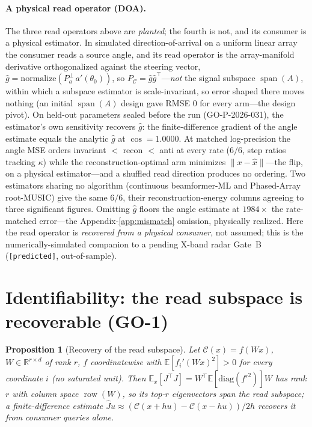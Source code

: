 \documentclass[11pt]{article}
\newtheorem{proposition}{Proposition}
\theoremstyle{definition}
\theoremstyle{remark}
\newcommand{\PC}{P_{\mathcal{C}}}
\newcommand{\E}{\mathbb{E}}
\newcommand{\R}{\mathbb{R}}
\begin{document}
\paragraph{A physical read operator (DOA).} The three read operators above are
\emph{planted}; the fourth is not, and its consumer is a physical estimator. In simulated
direction-of-arrival on a uniform linear array the consumer reads a source angle, and its
read operator is the array-manifold derivative orthogonalized against the steering vector,
$\hat g=\mathrm{normalize}(P_a^\perp\,a'(\theta_0))$, so $\PC=\hat g\hat g^\top$---\emph{not}
the signal subspace $\operatorname{span}(A)$, within which a subspace estimator is
scale-invariant, so error shaped there moves nothing (an initial $\operatorname{span}(A)$
design gave RMSE $0$ for every arm---the design pivot). On held-out parameters sealed before
the run (GO-P-2026-031), the estimator's own sensitivity recovers $\hat g$: the
finite-difference gradient of the angle estimate equals the analytic $\hat g$ at
$\cos=1.0000$. At matched log-precision the angle MSE orders invariant $<$ recon $<$ anti at
every rate ($6/6$, step ratios tracking $\kappa$) while the reconstruction-optimal arm
minimizes $\|x-\hat x\|$---the flip, on a physical estimator---and a shuffled read direction
produces no ordering. Two estimators sharing no algorithm (continuous beamformer-ML and
Phased-Array root-MUSIC) give the same $6/6$, their reconstruction-energy columns agreeing to
three significant figures. Omitting $\hat g$ floors the angle estimate at $1984\times$ the
rate-matched error---the Appendix-\ref{app:mismatch} omission, physically realized. Here the
read operator is \emph{recovered from a physical consumer}, not assumed; this is the
numerically-simulated companion to a pending X-band radar Gate~B (\texttt{[predicted]},
out-of-sample).

\section{Identifiability: the read subspace is recoverable (GO-1)}\label{sec:id}

\begin{proposition}[Recovery of the read subspace]\label{prop:id}
Let $\mathcal{C}(x)=f(Wx)$, $W\in\R^{r\times d}$ of rank $r$, $f$ coordinatewise with
$\E[f_i'(Wx)^2]>0$ for every coordinate $i$ (no saturated unit). Then
$\E_x[J^\top J]=W^\top\E[\mathrm{diag}(f'^2)]W$ has rank $r$ with column space
$\operatorname{row}(W)$, so its top-$r$ eigenvectors span the read subspace; a
finite-difference estimate $\hat J u\approx(\mathcal{C}(x{+}hu)-\mathcal{C}(x{-}hu))/2h$
recovers it from consumer queries alone.
\end{proposition}
\end{document}
